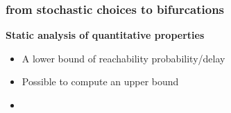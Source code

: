 \begin{frame}
 \frametitle{from stochastic choices to bifurcations}
 
 \textbf{Static analysis of quantitative properties}
 \begin{itemize}
  \item A lower bound of reachability  probability/delay
  \item Possible to compute an upper bound 
  \item 
 \end{itemize}

 
\end{frame}
